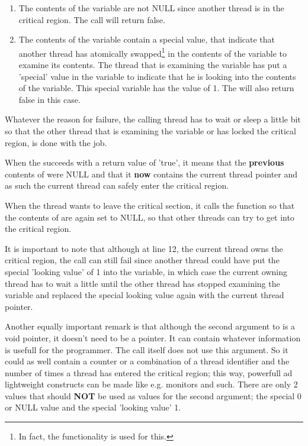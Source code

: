 \begin{enumerate}
\item The contents of the  variable are not NULL since another
thread is in the critical region. The  call will
return false.
\item The contents of the  variable contain a special value,
that indicate that another thread has atomically swapped\footnote{In fact,
the  functionality is used for this.} in the contents of
the  variable to examine its contents. The thread that is
examining the  variable has put a 'special' value in the
 variable to indicate that he is looking into the contents of
the  variable. This special variable has the value of 1. The
 will also return false in this case.
\end{enumerate}

Whatever the reason for failure, the calling thread has to wait or sleep a little
bit so that the other thread that is examining the variable or has locked the
critical region, is done with the job.

When the  succeeds with a return value of 'true',
it means that the \textbf{previous} contents of  were NULL and that it
\textbf{now} contains the current thread
pointer and as such the current thread can safely enter the critical region.

When the thread wants to leave the critical section, it calls the
 function so that the contents of  are
again set to NULL, so that other threads can try to get into the critical
region.

It is important to note that although at line 12, the current thread owns
the critical region, the  call can still fail since
another thread could have put the special 'looking value' of 1 into the
 variable, in which case the current owning thread has to wait
a little until the other thread has stopped examining the 
variable and replaced the special looking value again with the current
thread pointer.

Another equally important remark is that although the second argument to
 is a void pointer, it doesn't need to be a
pointer. It can contain whatever information is usefull for the programmer.
The call itself does not use this argument. So it could as well contain a
counter or a combination of a thread identifier and the number of times a
thread has entered the critical region; this way, powerfull ad lightweight constructs
can be made like e.g. monitors and such. There are only 2 values that should
\textbf{NOT} be used as values for the second argument; the special 0 or
NULL value and the special 'looking value' 1.

